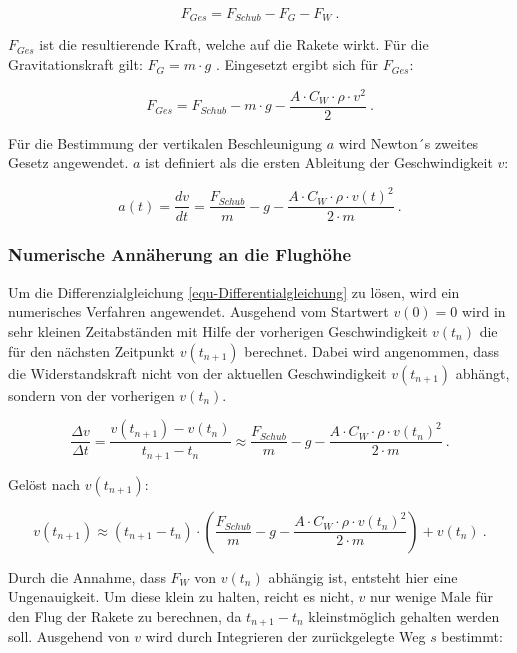 \documentclass[10pt,a4paper]{article}
\begin{document}
$$ F_{Ges}=F_{Schub}-F_{G}-F_{W} \ . $$

\noindent
$F_{Ges}$ ist die resultierende Kraft, welche auf die Rakete wirkt. Für die Gravitationskraft gilt: $F_{G}=m \cdot g$ \cite{fs}. Eingesetzt ergibt sich für $F_{Ges}$:

$$F_{Ges}=F_{Schub}-m \cdot g-\frac{A \cdot C_{W} \cdot \rho \cdot v^2}{2}  \ . $$

\noindent
Für die Bestimmung der vertikalen Beschleunigung $a$ wird Newton´s zweites Gesetz angewendet. $a$ ist definiert als die ersten Ableitung der Geschwindigkeit $v$:

\begin{equation}
 a(t) = \frac{dv}{dt} = \frac{F_{Schub}}{m}-g-\frac{A \cdot C_{W} \cdot \rho \cdot v(t)^2}{2 \cdot m} \ . 
 \label{equ-Differentialgleichung}
\end{equation}


\subsubsection{Numerische Annäherung an die Flughöhe}\label{sssec-Numerische-Annäherung}
Um die Differenzialgleichung \eqref{equ-Differentialgleichung} zu lösen, wird ein numerisches Verfahren angewendet. Ausgehend vom Startwert $v(0)=0$ wird in sehr kleinen Zeitabständen mit Hilfe der vorherigen Geschwindigkeit $v(t_{n})$ die für den nächsten Zeitpunkt $v(t_{n+1})$ berechnet. Dabei wird angenommen, dass die Widerstandskraft nicht von der aktuellen Geschwindigkeit $v(t_{n+1})$ abhängt, sondern von der vorherigen $v(t_{n})$.

$$ \frac{\Delta v} {\Delta t} = \frac{v(t_{n+1})-v(t_{n})}{t_{n+1}-t_{n}}\approx\frac{F_{Schub}}{m}-g-\frac{A \cdot C_{W} \cdot \rho \cdot v(t_{n})^2}{2 \cdot m} \ . $$

\noindent
Gelöst nach $v(t_{n+1})$:

\begin{equation}
v(t_{n+1})\approx(t_{n+1}-t_{n}) \cdot \left( \frac{F_{Schub}}{m}-g-\frac{A \cdot C_{W} \cdot \rho \cdot v(t_{n})^2}{2 \cdot m} \right) +v(t_{n}) \ .
\end{equation}

\noindent
Durch die Annahme, dass $F_{W}$ von $v(t_{n})$ abhängig ist, entsteht hier eine Ungenauigkeit. Um diese klein zu halten, reicht es nicht, $v$ nur wenige Male für den Flug der Rakete zu berechnen, da $t_{n+1}-t_{n}$ kleinstmöglich gehalten werden soll. Ausgehend von $v$ wird durch Integrieren der zurückgelegte Weg $s$ bestimmt:
\end{document}

